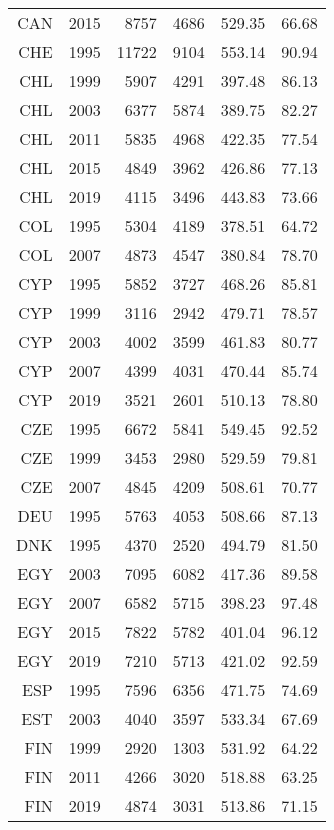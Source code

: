 \begin{longtable}{|r|r|r|r|r|r|}
    CAN   & 2015  & 8757  & 4686  & 529.35 & 66.68 \\
    CHE   & 1995  & 11722 & 9104  & 553.14 & 90.94 \\
    CHL   & 1999  & 5907  & 4291  & 397.48 & 86.13 \\
    CHL   & 2003  & 6377  & 5874  & 389.75 & 82.27 \\
    CHL   & 2011  & 5835  & 4968  & 422.35 & 77.54 \\
    CHL   & 2015  & 4849  & 3962  & 426.86 & 77.13 \\
    CHL   & 2019  & 4115  & 3496  & 443.83 & 73.66 \\
    COL   & 1995  & 5304  & 4189  & 378.51 & 64.72 \\
    COL   & 2007  & 4873  & 4547  & 380.84 & 78.70 \\
    CYP   & 1995  & 5852  & 3727  & 468.26 & 85.81 \\
    CYP   & 1999  & 3116  & 2942  & 479.71 & 78.57 \\
    CYP   & 2003  & 4002  & 3599  & 461.83 & 80.77 \\
    CYP   & 2007  & 4399  & 4031  & 470.44 & 85.74 \\
    CYP   & 2019  & 3521  & 2601  & 510.13 & 78.80 \\
    CZE   & 1995  & 6672  & 5841  & 549.45 & 92.52 \\
    CZE   & 1999  & 3453  & 2980  & 529.59 & 79.81 \\
    CZE   & 2007  & 4845  & 4209  & 508.61 & 70.77 \\
    DEU   & 1995  & 5763  & 4053  & 508.66 & 87.13 \\
    DNK   & 1995  & 4370  & 2520  & 494.79 & 81.50 \\
    EGY   & 2003  & 7095  & 6082  & 417.36 & 89.58 \\
    EGY   & 2007  & 6582  & 5715  & 398.23 & 97.48 \\
    EGY   & 2015  & 7822  & 5782  & 401.04 & 96.12 \\
    EGY   & 2019  & 7210  & 5713  & 421.02 & 92.59 \\
    ESP   & 1995  & 7596  & 6356  & 471.75 & 74.69 \\
    EST   & 2003  & 4040  & 3597  & 533.34 & 67.69 \\
    FIN   & 1999  & 2920  & 1303  & 531.92 & 64.22 \\
    FIN   & 2011  & 4266  & 3020  & 518.88 & 63.25 \\
    FIN   & 2019  & 4874  & 3031  & 513.86 & 71.15 \\

\end{longtable}
